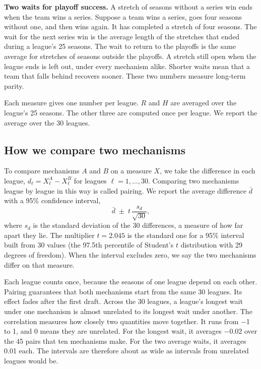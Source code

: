 \documentclass[11pt,letterpaper]{article}
\begin{document}
\textbf{Two waits for playoff success.} A stretch of seasons without a series win ends when the team wins a series. Suppose a team wins a series, goes four seasons without one, and then wins again. It has completed a stretch of four seasons. The wait for the next series win is the average length of the stretches that ended during a league's 25 seasons. The wait to return to the playoffs is the same average for stretches of seasons outside the playoffs. A stretch still open when the league ends is left out, under every mechanism alike. Shorter waits mean that a team that falls behind recovers sooner. These two numbers measure long-term parity.

Each measure gives one number per league. $R$ and $H$ are averaged over the league's 25 seasons. The other three are computed once per league. We report the average over the 30 leagues.

\subsection{How we compare two mechanisms}

To compare mechanisms $A$ and $B$ on a measure $X$, we take the difference in each league, $d_\ell = X^A_\ell - X^B_\ell$ for leagues $\ell = 1, \dots, 30$. Comparing two mechanisms league by league in this way is called pairing. We report the average difference $\bar{d}$ with a 95\% confidence interval,
\begin{equation}\label{eq:interval}
\bar{d} \;\pm\; t \, \frac{s_d}{\sqrt{30}},
\end{equation}
where $s_d$ is the standard deviation of the 30 differences, a measure of how far apart they lie. The multiplier $t = 2.045$ is the standard one for a 95\% interval built from 30 values (the 97.5th percentile of Student's $t$ distribution with 29 degrees of freedom). When the interval excludes zero, we say the two mechanisms differ on that measure.

Each league counts once, because the seasons of one league depend on each other. Pairing guarantees that both mechanisms start from the same 30 leagues. Its effect fades after the first draft. Across the 30 leagues, a league's longest wait under one mechanism is almost unrelated to its longest wait under another. The correlation measures how closely two quantities move together. It runs from −1 to 1, and 0 means they are unrelated. For the longest wait, it averages −0.02 over the 45 pairs that ten mechanisms make. For the two average waits, it averages 0.01 each. The intervals are therefore about as wide as intervals from unrelated leagues would be.
\end{document}
